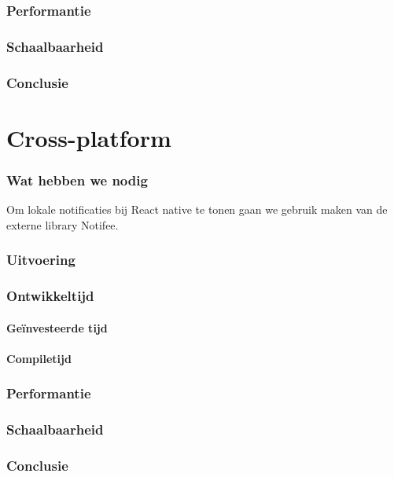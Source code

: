 \subsubsection{Performantie}

\subsubsection{Schaalbaarheid}

\subsubsection{Conclusie}


\section{Cross-platform}
\subsubsection{Wat hebben we nodig}
Om lokale notificaties bij React native te tonen gaan we gebruik maken van de externe library Notifee.



\subsubsection{Uitvoering}

\subsubsection{Ontwikkeltijd}

\paragraph{Geïnvesteerde tijd}

\paragraph{Compiletijd}

\subsubsection{Performantie}

\subsubsection{Schaalbaarheid}

\subsubsection{Conclusie}






















